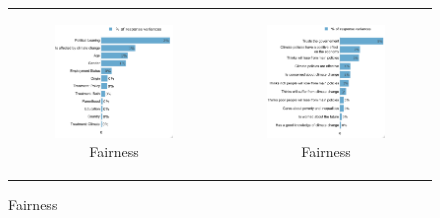 \documentclass{article}
\begin{document}
\begin{figure}[h!]
\begin{center}
	\caption{Variance decomposition LMG}
	\setlength\extrarowheight{-1pt}
	\begin{tabular}{cc}
		\begin{subfigure}{0.5\textwidth}
		\caption{Fairness}
			\includegraphics[width=\textwidth]{lmg_fairness_socio_non_standardized}
		\end{subfigure}&
		\begin{subfigure}{0.5\textwidth}
		\caption{Fairness}
			\includegraphics[width=\textwidth]{lmg_fairness_indices_non_standardized}
		\end{subfigure}\\
	\end{tabular}


\end{center}
\end{figure}
\end{document}
